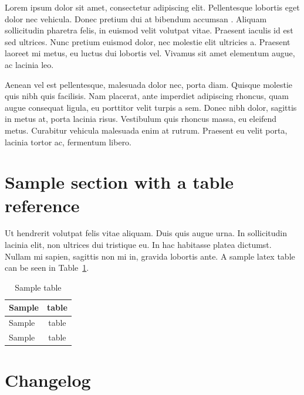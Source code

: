 Lorem ipsum dolor sit amet, consectetur adipiscing elit. Pellentesque lobortis eget dolor nec vehicula.
Donec pretium dui at bibendum accumsan \cite{cheswick}. Aliquam sollicitudin pharetra felis, in euismod velit volutpat 
vitae. Praesent iaculis id est sed ultrices. Nunc pretium euismod dolor, nec molestie elit ultricies a. 
Praesent laoreet mi metus, eu luctus dui lobortis vel. Vivamus sit amet elementum augue, ac lacinia leo.

Aenean vel est pellentesque, malesuada dolor nec, porta diam. Quisque molestie quis nibh quis facilisis. 
Nam placerat, ante imperdiet adipiscing rhoncus, quam augue consequat ligula, eu porttitor velit turpis 
a sem. Donec nibh dolor, sagittis in metus at, porta lacinia risus. Vestibulum quis rhoncus massa, eu 
eleifend metus. Curabitur vehicula malesuada enim at rutrum. Praesent eu velit porta, lacinia tortor ac, 
fermentum libero. \cite{kamara, al-shaer}


\section{Sample section with a table reference}

Ut hendrerit volutpat felis vitae aliquam. Duis quis augue urna. In sollicitudin lacinia elit, 
non ultrices dui tristique eu. In hac habitasse platea dictumst. Nullam mi sapien, sagittis non 
mi in, gravida lobortis ante. A sample latex table can be seen in Table~\ref{tab:sample_table}.


\begin{table}[!ht]
\def\arraystretch{1.1}%
\begin{center}
  \caption{Sample table}
  \label{tab:sample_table}
  \begin{tabular}{| l | c | }
    \hline
    Sample & table \\
    \hline
    Sample & table \\
    Sample & table \\
    \hline
  \end{tabular}

  \end{center}
\end{table}

\section{Changelog}

